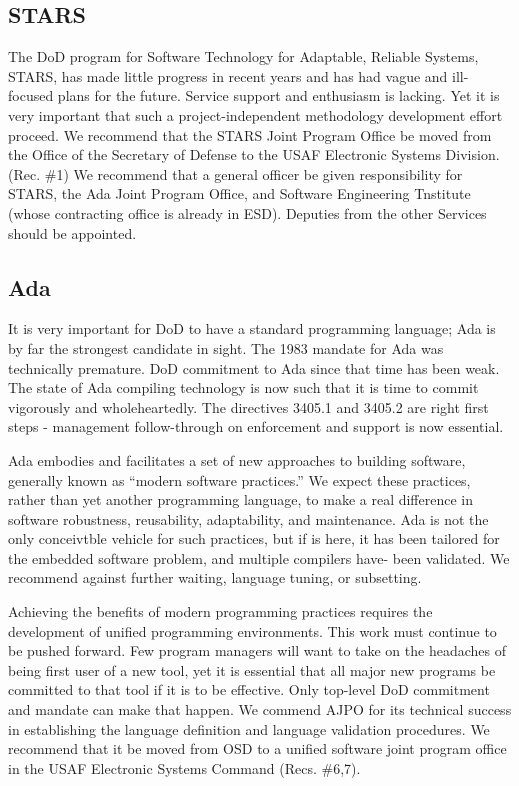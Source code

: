 \documentclass[12pt,final]{article}
\begin{document}
\subsection*{STARS}

The DoD program for Software Technology for Adaptable, Reliable Systems,
STARS, has made little progress in recent years and has had vague and
ill-focused plans for the future. Service support and enthusiasm is lacking.
Yet it is very important that such a project-independent methodology
development effort proceed. We recommend that the STARS Joint Program Office
be moved from the Office of the Secretary of Defense to the USAF Electronic
Systems Division. (Rec. \#1) We recommend that a general officer be given
responsibility for STARS, the Ada Joint Program Office, and Software
Engineering Tnstitute (whose contracting office is already in ESD). Deputies
from the other Services should be appointed.

\subsection*{Ada}

It is very important for DoD to have a standard programming language; Ada is
by far the strongest candidate in sight. The 1983 mandate for Ada was
technically premature. DoD commitment to Ada since that time has been weak.
The state of Ada compiling technology is now such that it is time to commit
vigorously and wholeheartedly.  The directives 3405.1 and 3405.2 are right
first steps - management follow-through on enforcement and support is now
essential.

Ada embodies and facilitates a set of new approaches to building software,
generally known as “modern software practices.” We expect these practices,
rather than yet another programming language, to make a real difference in
software robustness, reusability, adaptability, and maintenance. Ada is not
the only conceivtble vehicle for such practices, but if is here, it has been
tailored for the embedded software problem, and multiple compilers have- been
validated. We recommend against further waiting, language tuning, or
subsetting.

Achieving the benefits of modern programming practices requires the development of
unified programming environments. This work must continue to be pushed forward.
Few program managers will want to take on the headaches of being first user of a new
tool, yet it is essential that all major new programs be committed to that tool if it is to
be effective. Only top-level DoD commitment and mandate can make that happen.
We commend AJPO for its technical success in establishing the language definition and
language validation procedures. We recommend that it be moved from OSD to a unified
software joint program office in the USAF Electronic Systems Command (Recs. \#6,7).
\end{document}
